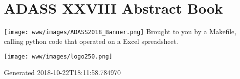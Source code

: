 \documentclass{report}
\begin{document}
              \chapter*{ADASS XXVIII Abstract Book}              
              \texttt{[image: www/images/ADASS2018\_Banner.png]}
              Brought to you by a Makefile, calling python code that operated on a Excel spreadsheet.
              \newline\newline
              \bigskip\bigskip
              \begin{center}
              \texttt{[image: www/images/logo250.png]}
              \end{center}
              \bigskip
           Generated 2018-10-22T18:11:58.784970\newpage
\end{document}
